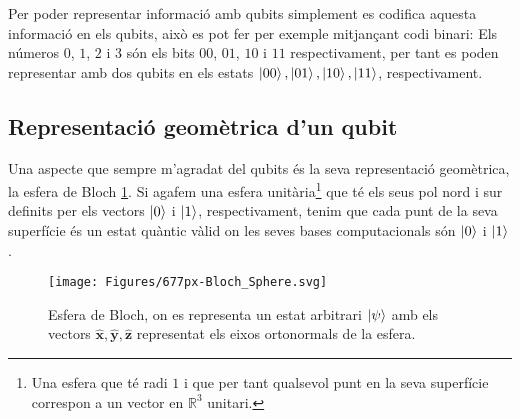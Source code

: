 Per poder representar informació amb qubits simplement es codifica aquesta informació en els qubits, això es pot fer per exemple mitjançant codi binari: Els números $0$, $1$, $2$ i $3$ són els bits $00$, $01$, $10$ i $11$ respectivament, per tant es poden representar amb dos qubits en els estats $\ket{00}, \ket{01}, \ket{10}, \ket{11}$, respectivament.

\subsection{Representació geomètrica d'un qubit}
Una aspecte que sempre m'agradat del qubits és la seva representació geomètrica, la esfera de Bloch \ref{fig:677px-blochsphere}. Si agafem una esfera unitària\footnote{Una esfera que té radi $1$ i que per tant qualsevol punt en la seva superfície correspon a un vector en $\mathbb{R}^3$ unitari. } que té els seus pol nord i sur definits per els vectors $\ket{0}$ i $\ket{1}$, respectivament, tenim que cada punt de la seva superfície és un estat quàntic vàlid on les seves bases computacionals són $\ket{0}$ i $\ket{1}$.
\begin{figure}
	\centering
	\texttt{[image: Figures/677px-Bloch\_Sphere.svg]}
	\caption{Esfera de Bloch, on es representa un estat arbitrari $\ket{\psi}$ amb els vectors $\hat{\mathbf{x}}, \hat{\mathbf{y}}, \hat{\mathbf{z}}$ representat els eixos ortonormals de la esfera. }
	\label{fig:677px-blochsphere}
\end{figure}

